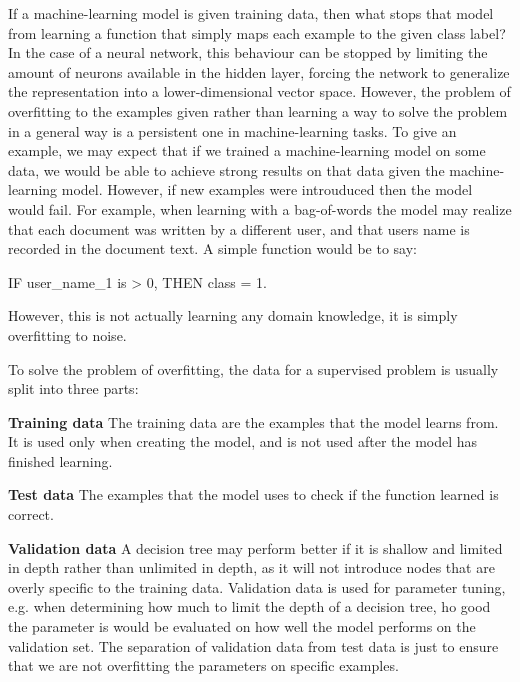 
If a machine-learning model is given training data, then what stops that model from learning a function that simply maps each example to the given class label? In the case of a neural network,  this behaviour can be stopped by limiting the amount of neurons available in the hidden layer, forcing the network to generalize the representation into a lower-dimensional vector space. However, the problem of overfitting to the examples given rather than learning a way to solve the problem in a general way is a persistent one in machine-learning tasks. To give an example, we may expect that if we trained a machine-learning model on some data, we would be able to achieve strong results on that data given the machine-learning model. However, if new examples were introuduced then the model would fail. For example, when learning with a bag-of-words the model may realize that each document was written by a different user, and that users name is recorded in the document text. A simple function would be to say:


IF user\_name\_1 is > 0, THEN class = 1.

However, this is not actually learning any domain knowledge, it is simply overfitting to noise.


To solve the problem of overfitting, the data for a supervised problem is usually split into three parts:

\textbf{Training data} The training data are the examples that the model learns from. It is used only when creating the model, and is not used after the model has finished learning.

\textbf{Test data} The examples that the model uses to check if the function learned is correct.

\textbf{Validation data} A decision tree may perform better if it is shallow and limited in depth rather than unlimited in depth, as it will not introduce nodes that are overly specific to the training data. Validation data is used for parameter tuning, e.g. when determining how much to limit the depth of a decision tree, ho good the parameter is would be evaluated on how well the model performs on the validation set. The separation of validation data from test data is just to ensure that we are not overfitting the parameters on specific examples.











